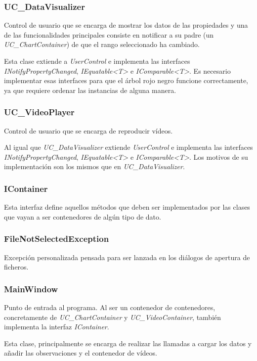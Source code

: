 \subsubsection{UC\_DataVisualizer}
Control de usuario que se encarga de mostrar los datos de las propiedades y una de las funcionalidades
principales consiste en notificar a su padre (un \emph{UC\_ChartContainer}) de que el rango seleccionado ha cambiado.

Esta clase extiende a \emph{UserControl} e implementa las interfaces \emph{INotifyPropertyChanged},
\emph{IEquatable<T>} e \emph{IComparable<T>}. Es necesario implementar
esas interfaces para que el \'arbol rojo negro funcione correctamente, ya que requiere ordenar las instancias
de alguna manera. 

\subsubsection{UC\_VideoPlayer}
Control de usuario que se encarga de reproducir v\'ideos.

Al igual que \emph{UC\_DataVisualizer} extiende \emph{UserControl} 
e implementa las interfaces \emph{INotifyPropertyChanged},
\emph{IEquatable<T>} e \emph{IComparable<T>}. Los motivos de su implementaci\'on
son los mismos que en \emph{UC\_DataVisualizer}.

\subsubsection{IContainer}
Esta interfaz define aquellos m\'etodos que deben ser implementados por las clases que vayan a ser contenedores
de alg\'un tipo de dato.

\subsubsection{FileNotSelectedException}
Excepci\'on personalizada pensada para ser lanzada en los di\'alogos de apertura de ficheros.

\subsubsection{MainWindow}
Punto de entrada al programa. Al ser un contenedor de contenedores, concretamente de \emph{UC\_ChartContainer} y
\emph{UC\_VideoContainer}, tambi\'en implementa la interfaz \emph{IContainer}.

Esta clase, principalmente se encarga de realizar las llamadas a cargar los datos y añadir las observaciones
y el contenedor de v\'ideos.